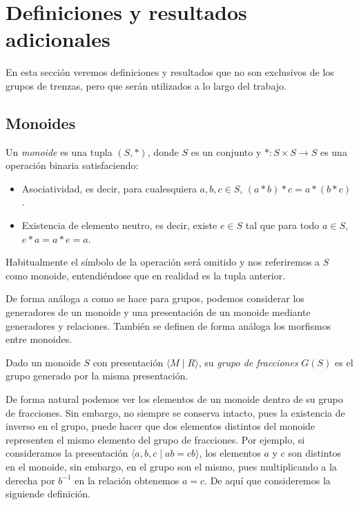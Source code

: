 \documentclass[TFG.tex]{subfiles}
\begin{document}
\section{Definiciones y resultados adicionales}

En esta sección veremos definiciones y resultados que no son exclusivos de los grupos de trenzas, pero que serán utilizados a lo largo del trabajo. 

\subsection{Monoides}

\begin{defi}
Un \emph{monoide} es una tupla $(S,*)$, donde $S$ es un conjunto y $*:S\times S\to S$ es una operación binaria satisfaciendo:
\begin{itemize}
\item Asociatividad, es decir, para cualesquiera $a,b,c\in S$, $(a*b)*c=a*(b*c)$.
\item Existencia de elemento neutro, es decir, existe $e\in S$ tal que para todo $a\in S$, $e*a=a*e=a$. 
\end{itemize}
Habitualmente el símbolo de la operación será omitido y nos referiremos a $S$ como monoide, entendiéndose que en realidad es la tupla anterior.
\end{defi}

De forma análoga a como se hace para grupos, podemos considerar los generadores de un monoide y una presentación de un monoide mediante generadores y relaciones. También se definen de forma análoga los morfismos entre monoides. 

\begin{defi}
Dado un monoide $S$ con presentación $\langle M\mid R\rangle$, su \emph{grupo de fracciones} $G(S)$ es el grupo generado por la misma presentación.
\end{defi}

De forma natural podemos ver los elementos de un monoide dentro de su grupo de fracciones. Sin embargo, no siempre se conserva intacto, pues la existencia de inverso en el grupo, puede hacer que dos elementos distintos del monoide representen el mismo elemento del grupo de fracciones. Por ejemplo, si consideramos la presentación $\langle a,b,c\mid ab=cb\rangle$, los elementos $a$ y $c$ son distintos en el monoide, sin embargo, en el grupo son el mismo, pues multiplicando a la derecha por $b^{-1}$ en la relación obtenemos $a=c$. De aquí que consideremos la siguiende definición.
\end{document}

